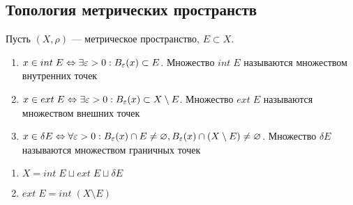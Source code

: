 \subsection{Топология метрических пространств}
\begin{definition}
    Пусть \((X, \rho)\) --- метрическое пространство, \(E \subset X\).
    \begin{enumerate}
        \item \(x \in int\;E \Leftrightarrow \exists \varepsilon > 0: B_{\varepsilon}(x) \subset E\). Множество \(int\;E\) называются множеством внутренних точек
        \item \(x \in ext\;E \Leftrightarrow \exists \varepsilon > 0: B_{\varepsilon}(x) \subset X \setminus E\). Множество \(ext\;E\) называются множеством внешних точек
        \item \(x \in \delta E \Leftrightarrow \forall \varepsilon > 0: B_{\varepsilon}(x) \cap E \ne \varnothing, B_{\varepsilon}(x) \cap (X \setminus E) \ne \varnothing\). Множество \(\delta E\) называются множеством граничных точек
    \end{enumerate}
\end{definition}

\begin{definition}\indent
    \begin{enumerate}
        \item \(X = int\;E \sqcup ext\;E \sqcup \delta E\)
        \item \(ext\;E = int\;(X \setminus E)\)
    \end{enumerate}
\end{definition}

